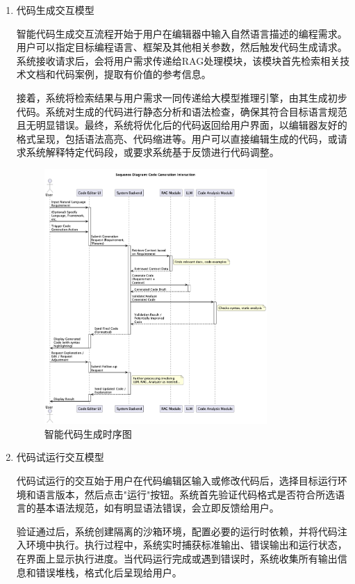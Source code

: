 \documentclass[
    report,     %
    oneside,    %
    UTF8,       %
    zihao=-4    %
]{config} %
\begin{document}
\begin{enumerate}[label=(\arabic*)]
    \item 代码生成交互模型
    
    智能代码生成交互流程开始于用户在编辑器中输入自然语言描述的编程需求。用户可以指定目标编程语言、框架及其他相关参数，然后触发代码生成请求。系统接收请求后，会将用户需求传递给RAG处理模块，该模块首先检索相关技术文档和代码案例，提取有价值的参考信息。
    
    接着，系统将检索结果与用户需求一同传递给大模型推理引擎，由其生成初步代码。系统对生成的代码进行静态分析和语法检查，确保其符合目标语言规范且无明显错误。最终，系统将优化后的代码返回给用户界面，以编辑器友好的格式呈现，包括语法高亮、代码缩进等。用户可以直接编辑生成的代码，或请求系统解释特定代码段，或要求系统基于反馈进行代码调整。
    \begin{figure}[H]
        \centering
        \includegraphics[width=0.8\textwidth]{UML/Squence/CodeGenerationSequenceDiagram.png}
        \caption{智能代码生成时序图}
        \label{fig:CodeGenerationSequenceDiagram}
    \end{figure}
    
    \item 代码试运行交互模型
    
    代码试运行的交互始于用户在代码编辑区输入或修改代码后，选择目标运行环境和语言版本，然后点击"运行"按钮。系统首先验证代码格式是否符合所选语言的基本语法规范，如有明显语法错误，会立即反馈给用户。
    
    验证通过后，系统创建隔离的沙箱环境，配置必要的运行时依赖，并将代码注入环境中执行。执行过程中，系统实时捕获标准输出、错误输出和运行状态，在界面上显示执行进度。当代码运行完成或遇到错误时，系统收集所有输出信息和错误堆栈，格式化后呈现给用户。
    

\end{enumerate}
\end{document}
